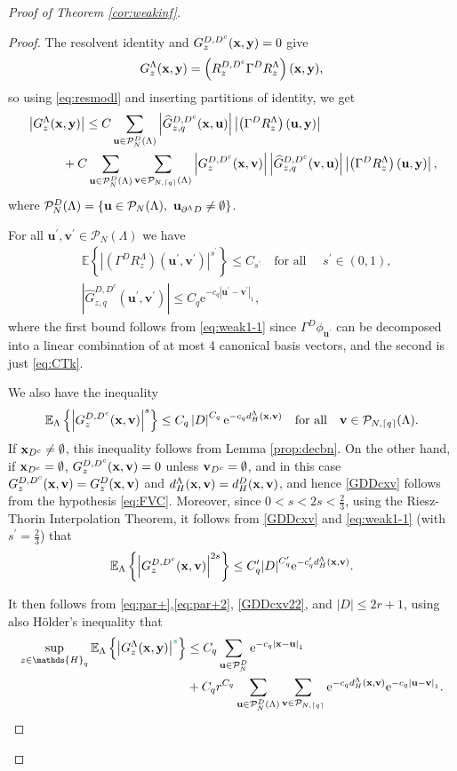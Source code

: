 \documentclass[12pt, a4paper,reqno]{amsart}
\newcommand{\fg}{\color{ForestGreen}}
\numberwithin{equation}{section}
\renewcommand\u{\mathbf{u}}
\renewcommand\v{\mathbf{v}}
\newcommand\e{\mathrm{e}}
\newcommand\E{\mathbb E}
\newcommand\cP{\mathcal{P}}
\newcommand{\pr}{\prime}
\newcommand\what{\widehat}
\newcommand\be{\begin{equation}\begin{aligned}}
\newcommand\ee{\end{aligned}\end{equation}}
\newcommand{\abs}[1]{\left\lvert #1 \right\rvert}
\newcommand{\set}[1]{\left\{ #1 \right\}}
\newcommand{\pa}[1]{\left( #1 \right)}
\newcommand{\cl}[1]{\lceil #1 \rceil}
\newcommand\La{\Lambda}
\newcommand{\eq}[1]{\eqref{#1}}
\newcommand{\qtx}[1]{\quad\text{#1}\quad}
\begin{document}
\begin{proof}[Proof of  Theorem \ref{cor:weakinf}]
\begin{proof}
 

The resolvent identity and  $G_z^{D,D^c} ({\bf x},{\bf y})=0$ give
\be
G_z^\La ({\bf x},{\bf y})=\pa{R_z^{D,D^c} \Gamma^D  R_z^\La }({\bf x},{\bf y}),
\ee
so using   \eqref{eq:resmodl} and inserting partitions of identity, we get
\be\label{eq:par+}
&\abs{G_z^\La ({\bf x},{\bf y}) }\le C\sum_{{\bf u}\in\cP^D_N(\La)}  \abs{\what G_{z,q}^{D,D^c} ({\bf x},{\bf u})}\abs{ \pa{\Gamma^D R_z^\La} ({\bf u},{\bf y})}\\&\hspace{1cm}+C\sum_{{\bf u}\in \cP^D_N(\La)}\sum_{{\bf v}\in \cP_{N,\cl{q}}(\La)}     \abs{ G_z^{D,D^c} ({\bf x},{\bf v})} \abs{\what G_{z,q}^{D,D^c} ({\bf v},{\bf u})} \abs{ \pa{\Gamma^D R_z^\La} ({\bf u},{\bf y})} ,
\ee
where $\cP^D_N(\La)=\set{{\bf u}\in \cP_N(\La), \  {\bf u}_{\partial^\La D}\neq\emptyset}$. 


For all $\u^\pr, \v^\pr \in \cP_N(\La)$ we have
\be \label{eq:par+2}
&   \E\set{\abs{ \pa{\Gamma^D R_z^\La } (\u^\pr, \v^\pr)}^{s^\pr}}\le C_{s^\pr}  \qtx{for all } s^\pr  \in (0,1),  \\
& \abs{\what G_{z,q}^{D,D^c} (\u^\pr, \v^\pr)} \le  C_q\e^{-c_q \abs{\u^\pr- \v^\pr}_1} ,
\ee
where the first bound follows from \eqref {eq:weak1-1}  since  $  \Gamma^D \phi_{\u^\pr} $ can be decomposed into a linear combination of at most 4 canonical basis vectors, and   the second is just  \eqref{eq:CTk}. 

We also have the inequality
 \be \label{GDDcxv}
\E_\La\set{\abs{ G_z^{D,D^c} ({\bf x},{\bf v})}^{s}}\le C_q\abs{D}^{C_q}  \e^{-c_q d^\La_H ({\bf x},{\bf v})} \qtx{for all}  \v\in \cP_{N,\cl{q}}(\La).
\ee 
If ${\bf x}_{D^c}\neq\emptyset$, this inequality follows from Lemma \ref {prop:decbn}. On the other hand, 
if ${\bf x}_{D^c}=\emptyset$,  $G_z^{D,D^c} ({\bf x},{\bf v})=0$  unless  ${\bf v}_{D^c}=\emptyset$, and in this case    $G_z^{D,D^c} ({\bf x},{\bf v})= G_z^{D} ({\bf x},{\bf v})$ and $d^\La_H ({\bf x},{\bf v})=d^D_H ({\bf x},{\bf v})$, and hence \eq{GDDcxv} follows from the hypothesis  \eqref{eq:FVC}.
Moreover, since $0<s <2s <\frac 23$, using the Riesz-Thorin Interpolation Theorem, it follows from \eq{GDDcxv}  and  \eqref {eq:weak1-1}   (with $s^\pr=\frac 23 $)  that
 \be \label{GDDcxv22}
\E_\La\set{\abs{ G_z^{D,D^c} ({\bf x},{\bf v})}^{2s}}\le C^\pr_q {\abs{D}}^{C^\pr_q}  \e^{-c^\pr_q d^\La_H ({\bf x},{\bf v})}.
\ee





   
It then follows from \eq{eq:par+},\eq{eq:par+2},   \eq{GDDcxv22}, and $\abs{D} \le 2r +1$, using also  H\"older's inequality  that
\be\label{eq:almth55}
\sup_{z\in\mathds{H}_q}\E_\La\set{\abs{G_z^\La ({\bf x},{\bf y})}^{{\fg s}}}&\le 
C_q\sum_{{\bf u}\in \cP^D_{N}} \e^{-c_q \abs{{\bf x}-{\bf u}}_1}\\&+
C_q r^{C_q}\sum_{{\bf u}\in \cP^D_N(\La)}\sum_{{\bf v}\in\cP_{N,\cl{q}}}  \e^{-c_q d_H^\La  ({\bf x},{\bf v})} \e^{-c_q \abs{{\bf u}-{\bf v}}_1}.
\ee


\end{proof}
\end{proof}
\end{document}
